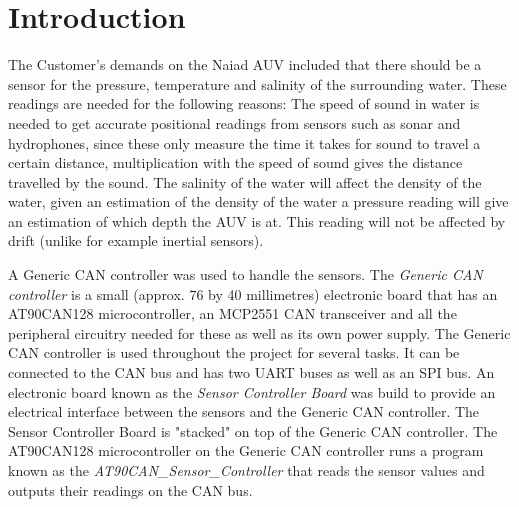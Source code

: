 
\section{Introduction}\label{sec:introduction}
The Customer's demands on the Naiad AUV included that there should be a sensor for the pressure, temperature and salinity of the surrounding water. These readings are needed for the following reasons: \newline
The speed of sound in water is needed to get accurate positional readings from sensors such as sonar and hydrophones, since these only measure the time it takes for sound to travel a certain distance, multiplication with the speed of sound gives the distance travelled by the sound. \newline
The salinity of the water will affect the density of the water, given an estimation of the density of the water a pressure reading will give an estimation of which depth the AUV is at. This reading will not be affected by drift (unlike for example inertial sensors).

A Generic CAN controller was used to handle the sensors. The \emph{Generic CAN controller} is a small (approx. 76 by 40 millimetres) electronic board that has an AT90CAN128 microcontroller, an MCP2551 CAN transceiver and all the peripheral circuitry needed for these as well as its own power supply. The Generic CAN controller is used throughout the project for several tasks. It can be connected to the CAN bus and has two UART buses as well as an SPI bus. \newline
An electronic board known as the \emph{Sensor Controller Board} was build to provide an electrical interface between the sensors and the Generic CAN controller. The Sensor Controller Board is "stacked" on top of the Generic CAN controller. \newline
The AT90CAN128 microcontroller on the Generic CAN controller runs a program known as the \newline
\emph{AT90CAN\_Sensor\_Controller} that reads the sensor values and outputs their readings on the CAN bus.


